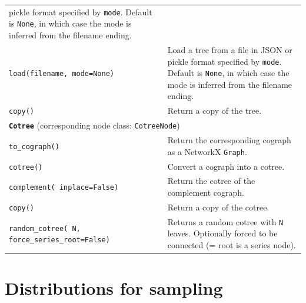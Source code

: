 \documentclass[hidelinks,11pt]{article}
\begin{document}
{\begin{longtable}{| p{4.0cm} | p{10cm} |}
    pickle format specified by \texttt{mode}. Default is \texttt{None}, in 
    which case the mode is inferred from the filename ending.\\
    \texttt{load(filename, mode=None)} & Load a tree from a file in JSON or 
    pickle format specified by \texttt{mode}. Default is \texttt{None}, in 
    which case the mode is inferred from the filename ending.\\
    \texttt{copy()} & Return a copy of the tree.\\
    \hline
    \multicolumn{2}{|l|}{\textbf{\texttt{Cotree}} (corresponding node class: 
      \texttt{CotreeNode})}\\
    \hline
    \texttt{to\_cograph()} & Return the corresponding cograph as a NetworkX 
    \texttt{Graph}.\\
    \texttt{cotree()} & Convert a cograph into a cotree.\\
    \texttt{complement( 
      inplace=False)} & Return the cotree of the complement 
    cograph.\\
    \texttt{copy()} & Return a copy of the cotree.\\
    \texttt{random\_cotree( N, force\_series\_root=False)} & Returns a random 
    cotree with \texttt{N} leaves. Optionally forced to be connected (= root is 
    a series node).\\
  \end{longtable}
}


\section{Distributions for sampling}\label{apx:sampling}
\end{document}
